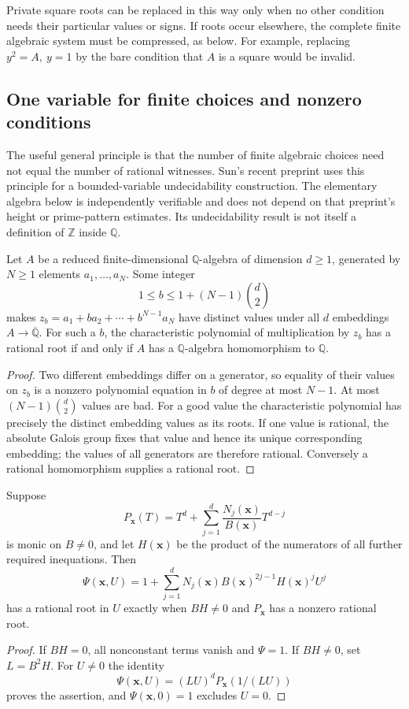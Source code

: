 Private square roots can be replaced in this way only when no other
condition needs their particular values or signs. If roots occur elsewhere,
the complete finite algebraic system must be compressed, as below.
For example, replacing $y^2=A,\ y=1$ by the bare condition that $A$
is a square would be invalid.

\subsection{One variable for finite choices and nonzero conditions}

The useful general principle is that the number of finite algebraic
choices need not equal the number of rational witnesses. Sun's recent
preprint \cite[Sections 10.3--10.6]{Sun2026Rational86} uses this principle
for a bounded-variable undecidability construction. The elementary
algebra below is independently verifiable and does not depend on that
preprint's height or prime-pattern estimates. Its undecidability result
is not itself a definition of $\mathbb Z$ inside $\mathbb Q$.

\begin{lemma}\label{lem:finite-separation}
Let $A$ be a reduced finite-dimensional $\mathbb Q$-algebra of dimension
$d\ge1$, generated by $N\ge1$ elements $a_1,\ldots,a_N$. Some integer
\[
 1\le b\le1+(N-1)\binom d2
\]
makes $z_b=a_1+ba_2+\cdots+b^{N-1}a_N$ have distinct values under all
$d$ embeddings $A\to\overline{\mathbb Q}$. For such a $b$, the
characteristic polynomial of multiplication by $z_b$ has a rational root
if and only if $A$ has a $\mathbb Q$-algebra homomorphism to $\mathbb Q$.
\end{lemma}
\begin{proof}
Two different embeddings differ on a generator, so equality of their
values on $z_b$ is a nonzero polynomial equation in $b$ of degree at most
$N-1$. At most $(N-1)\binom d2$ values are bad. For a good value the
characteristic polynomial has precisely the distinct embedding values
as its roots. If one value is rational, the absolute Galois group fixes
that value and hence its unique corresponding embedding; the values
of all generators are therefore rational. Conversely a rational
homomorphism supplies a rational root.
\end{proof}

\begin{lemma}\label{lem:reciprocal-guard}
Suppose
\[
 P_{\mathbf x}(T)=T^d+\sum_{j=1}^d
 \frac{N_j(\mathbf x)}{B(\mathbf x)}T^{d-j}
\]
is monic on $B\ne0$, and let $H(\mathbf x)$ be the product of the
numerators of all further required inequations. Then
\[
 \Psi(\mathbf x,U)=1+\sum_{j=1}^d
 N_j(\mathbf x)B(\mathbf x)^{2j-1}H(\mathbf x)^jU^j
\]
has a rational root in $U$ exactly when $BH\ne0$ and $P_{\mathbf x}$
has a nonzero rational root.
\end{lemma}
\begin{proof}
If $BH=0$, all nonconstant terms vanish and $\Psi=1$.
If $BH\ne0$, set $L=B^2H$. For $U\ne0$ the identity
\[
 \Psi(\mathbf x,U)=(LU)^dP_{\mathbf x}(1/(LU))
\]
proves the assertion, and $\Psi(\mathbf x,0)=1$ excludes $U=0$.
\end{proof}

